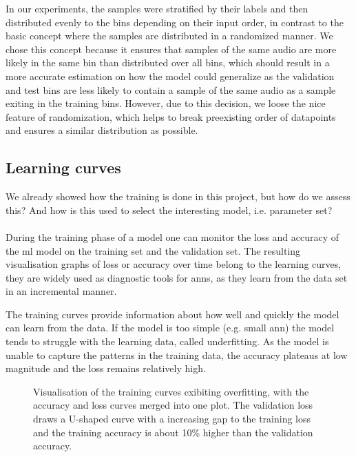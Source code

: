 
In our experiments, the samples were stratified by their labels and then distributed evenly to the bins depending on their input order, in contrast to the basic concept where the samples are distributed in a randomized manner. We chose this concept because it ensures that samples of the same audio are more likely in the same bin than distributed over all bins, which should result in a more accurate estimation on how the model could generalize as the validation and test bins are less likely to contain a sample of the same audio as a sample exiting in the training bins.
However, due to this decision, we loose the nice feature of randomization, which helps to break preexisting order of datapoints and ensures a similar distribution as possible.

\subsection{Learning curves}
We already showed how the training is done in this project, but how do we assess this? And how is this used to select the interesting model, i.e. parameter set?\\\\

During the training phase of a model one can monitor the loss and accuracy of the \gls{ml} model on the training set and the validation set. The resulting visualisation graphs of loss or accuracy over time belong to the learning curves, they are widely used as diagnostic tools for \glspl{ann}, as they learn from the data set in an incremental manner.

The training curves provide information about how well and quickly the model can learn from the data.
If the model is too simple (e.g. small \gls{ann}) the model tends to struggle with the learning data, called underfitting. As the model is unable to capture the patterns in the training data, the accuracy plateaus at low magnitude and the loss remains relatively high.

\begin{figure}[ht!]
\centering
  \hfill
  \caption{Visualisation of the training curves exibiting overfitting, with the accuracy and loss curves merged into one plot. The validation loss draws a U-shaped curve with a increasing gap to the training loss and the training accuracy is about 10\% higher than the validation accuracy.}
  \label{fig:train_val_cnn_1d_sct_compressed_nrs0_raw_100}
\end{figure}


